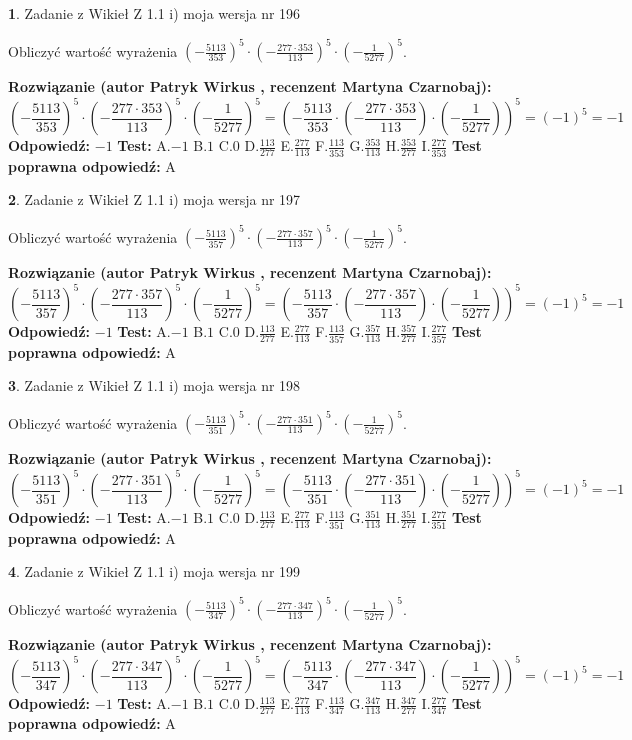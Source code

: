 \documentclass[12pt, a4paper]{article}
\theoremstyle{definition} %
\newtheorem{zad}{}
\newcommand{\zadStart}[1]{\begin{zad}#1\newline}
\newcommand{\zadStop}{\end{zad}}
\newcommand{\rozwStart}[2]{\noindent \textbf{Rozwiązanie (autor #1 , recenzent #2): }\newline}
\newcommand{\rozwStop}{\newline}
\newcommand{\odpStart}{\noindent \textbf{Odpowiedź:}\newline}
\newcommand{\odpStop}{\newline}
\newcommand{\testStart}{\noindent \textbf{Test:}\newline}
\newcommand{\testStop}{\newline}
\newcommand{\kluczStart}{\noindent \textbf{Test poprawna odpowiedź:}\newline}
\newcommand{\kluczStop}{\newline}
\begin{document}
\zadStart{Zadanie z Wikieł Z 1.1 i) moja wersja nr 196}

Obliczyć wartość wyrażenia $(-\frac{5113}{353})^{5} \cdot (-\frac{277 \cdot 353}{113})^{5} \cdot (-\frac{1}{5277})^{5}$.
\zadStop
\rozwStart{Patryk Wirkus}{Martyna Czarnobaj}
$$(-\frac{5113}{353})^{5} \cdot (-\frac{277 \cdot 353}{113})^{5} \cdot (-\frac{1}{5277})^{5} = (-\frac{5113}{353} \cdot (-\frac{277 \cdot 353}{113}) \cdot (-\frac{1}{5277}))^{5} = (-1)^{5} = -1$$
\rozwStop
\odpStart
$-1$
\odpStop
\testStart
A.$-1$ B.$1$ C.$0$ D.$\frac{113}{277}$ E.$\frac{277}{113}$
F.$\frac{113}{353}$ G.$\frac{353}{113}$
H.$\frac{353}{277}$
I.$\frac{277}{353}$
\testStop
\kluczStart
A
\kluczStop



\zadStart{Zadanie z Wikieł Z 1.1 i) moja wersja nr 197}

Obliczyć wartość wyrażenia $(-\frac{5113}{357})^{5} \cdot (-\frac{277 \cdot 357}{113})^{5} \cdot (-\frac{1}{5277})^{5}$.
\zadStop
\rozwStart{Patryk Wirkus}{Martyna Czarnobaj}
$$(-\frac{5113}{357})^{5} \cdot (-\frac{277 \cdot 357}{113})^{5} \cdot (-\frac{1}{5277})^{5} = (-\frac{5113}{357} \cdot (-\frac{277 \cdot 357}{113}) \cdot (-\frac{1}{5277}))^{5} = (-1)^{5} = -1$$
\rozwStop
\odpStart
$-1$
\odpStop
\testStart
A.$-1$ B.$1$ C.$0$ D.$\frac{113}{277}$ E.$\frac{277}{113}$
F.$\frac{113}{357}$ G.$\frac{357}{113}$
H.$\frac{357}{277}$
I.$\frac{277}{357}$
\testStop
\kluczStart
A
\kluczStop



\zadStart{Zadanie z Wikieł Z 1.1 i) moja wersja nr 198}

Obliczyć wartość wyrażenia $(-\frac{5113}{351})^{5} \cdot (-\frac{277 \cdot 351}{113})^{5} \cdot (-\frac{1}{5277})^{5}$.
\zadStop
\rozwStart{Patryk Wirkus}{Martyna Czarnobaj}
$$(-\frac{5113}{351})^{5} \cdot (-\frac{277 \cdot 351}{113})^{5} \cdot (-\frac{1}{5277})^{5} = (-\frac{5113}{351} \cdot (-\frac{277 \cdot 351}{113}) \cdot (-\frac{1}{5277}))^{5} = (-1)^{5} = -1$$
\rozwStop
\odpStart
$-1$
\odpStop
\testStart
A.$-1$ B.$1$ C.$0$ D.$\frac{113}{277}$ E.$\frac{277}{113}$
F.$\frac{113}{351}$ G.$\frac{351}{113}$
H.$\frac{351}{277}$
I.$\frac{277}{351}$
\testStop
\kluczStart
A
\kluczStop



\zadStart{Zadanie z Wikieł Z 1.1 i) moja wersja nr 199}

Obliczyć wartość wyrażenia $(-\frac{5113}{347})^{5} \cdot (-\frac{277 \cdot 347}{113})^{5} \cdot (-\frac{1}{5277})^{5}$.
\zadStop
\rozwStart{Patryk Wirkus}{Martyna Czarnobaj}
$$(-\frac{5113}{347})^{5} \cdot (-\frac{277 \cdot 347}{113})^{5} \cdot (-\frac{1}{5277})^{5} = (-\frac{5113}{347} \cdot (-\frac{277 \cdot 347}{113}) \cdot (-\frac{1}{5277}))^{5} = (-1)^{5} = -1$$
\rozwStop
\odpStart
$-1$
\odpStop
\testStart
A.$-1$ B.$1$ C.$0$ D.$\frac{113}{277}$ E.$\frac{277}{113}$
F.$\frac{113}{347}$ G.$\frac{347}{113}$
H.$\frac{347}{277}$
I.$\frac{277}{347}$
\testStop
\kluczStart
A
\kluczStop
\end{document}
